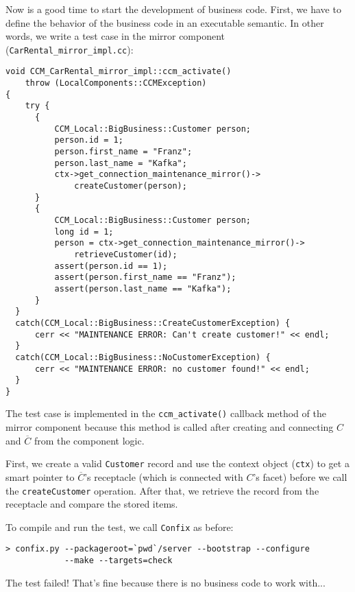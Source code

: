 Now is a good time to start the development of business code. First, we have to
define the behavior of the business code in an executable semantic. 
In other words, we write a test case in the mirror component 
({\tt CarRental\_mirror\_impl.cc}):

\begin{small}
\begin{verbatim}
void CCM_CarRental_mirror_impl::ccm_activate()
    throw (LocalComponents::CCMException)
{
    try {
      {
          CCM_Local::BigBusiness::Customer person;
          person.id = 1;
          person.first_name = "Franz";
          person.last_name = "Kafka";
          ctx->get_connection_maintenance_mirror()->
              createCustomer(person);
      }
      {
          CCM_Local::BigBusiness::Customer person;
          long id = 1;
          person = ctx->get_connection_maintenance_mirror()->
              retrieveCustomer(id);
          assert(person.id == 1);
          assert(person.first_name == "Franz");
          assert(person.last_name == "Kafka");
      }
  }
  catch(CCM_Local::BigBusiness::CreateCustomerException) {
      cerr << "MAINTENANCE ERROR: Can't create customer!" << endl;
  }
  catch(CCM_Local::BigBusiness::NoCustomerException) {
      cerr << "MAINTENANCE ERROR: no customer found!" << endl;
  }
}
\end{verbatim}
\end{small}
The test case is implemented in the {\tt ccm\_activate()} callback method of the
mirror component because this method is called after creating and connecting $C$
and $\overline{C}$ from the component logic. 

First, we create a valid {\tt Customer} record and  
use the context object ({\tt ctx}) to get a smart pointer
to $\overline{C}$'s receptacle (which is connected with $C$'s facet) 
before we call the {\tt createCustomer} operation. 
After that, we retrieve the record from the receptacle and compare the stored 
items.

To compile and run the test, we call {\tt Confix} as before:
\begin{small}
\begin{verbatim}
> confix.py --packageroot=`pwd`/server --bootstrap --configure 
            --make --targets=check 
\end{verbatim}
\end{small}
The test failed! 
That's fine because there is no business code to work with...






